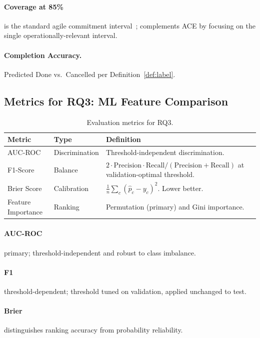 \paragraph{Coverage at 85\%} is the standard agile commitment
interval~\cite{vacanti2015}; complements ACE by focusing on the single
operationally-relevant interval.

\paragraph{Completion Accuracy.} Predicted Done vs.\ Cancelled per
Definition~\ref{def:label}.


\subsection{Metrics for RQ3: ML Feature Comparison}
\label{sec:metrics-rq3}

\begin{table}[ht]
\centering
\caption{Evaluation metrics for RQ3.}
\label{tab:metrics-rq3}
\small
\begin{tabular}{@{}l l p{7.4cm}@{}}
\toprule
\textbf{Metric} & \textbf{Type} & \textbf{Definition} \\
\midrule
AUC-ROC & Discrimination & Threshold-independent discrimination. \\
F1-Score & Balance & $2 \cdot \mathrm{Precision} \cdot \mathrm{Recall} / (\mathrm{Precision} + \mathrm{Recall})$ at validation-optimal threshold. \\
Brier Score & Calibration & $\tfrac{1}{n}\sum_c (\hat{p}_c - y_c)^2$. Lower better. \\
Feature Importance & Ranking & Permutation (primary) and Gini importance. \\
\bottomrule
\end{tabular}
\end{table}

\paragraph{AUC-ROC} primary; threshold-independent and robust to class
imbalance. \paragraph{F1} threshold-dependent; threshold tuned on
validation, applied unchanged to test. \paragraph{Brier} distinguishes
ranking accuracy from probability reliability.
